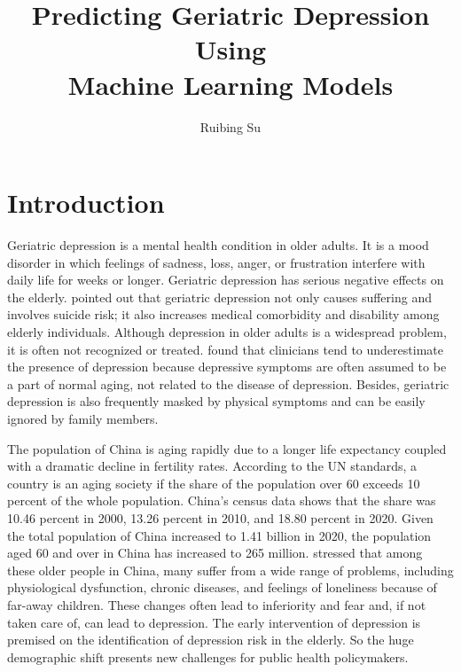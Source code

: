 \documentclass[12pt]{article}
\title{ Predicting Geriatric Depression Using \\ Machine Learning Models}
\date{}
\author{Ruibing Su}
\begin{document}
\maketitle

\section{Introduction}
\par Geriatric depression is a mental health condition in older adults. It is a mood disorder in which feelings of sadness, loss, anger, or frustration interfere with daily life for weeks or longer. Geriatric depression has serious negative effects on the elderly. \cite{alexopoulos2009research} pointed out that geriatric depression not only causes suffering and involves suicide risk; it also increases medical comorbidity and disability among elderly individuals. Although depression in older adults is a widespread problem, it is often not recognized or treated. \cite{onishi2006comparison} found that clinicians tend to underestimate the presence of depression because depressive symptoms are often assumed to be a part of normal aging, not related to the disease of depression. Besides, geriatric depression is also frequently masked by physical symptoms and can be easily ignored by family members.

\par The population of China is aging rapidly due to a longer life expectancy coupled with a dramatic decline in fertility rates. According to the UN standards, a country is an aging society if the share of the population over 60 exceeds 10 percent of the whole population. China’s census data shows that the share was 10.46 percent in 2000, 13.26 percent in 2010, and 18.80 percent in 2020. Given the total population of China increased to 1.41 billion in 2020, the population aged 60 and over in China has increased to 265 million. \cite{zhang2012prevalence} stressed that among these older people in China, many suffer from a wide range of problems, including physiological dysfunction, chronic diseases, and feelings of loneliness because of far-away children. These changes often lead to inferiority and fear and, if not taken care of, can lead to depression. The early intervention of depression is premised on the identification of depression risk in the elderly. So the huge demographic shift presents new challenges for public health policymakers.
\end{document}
